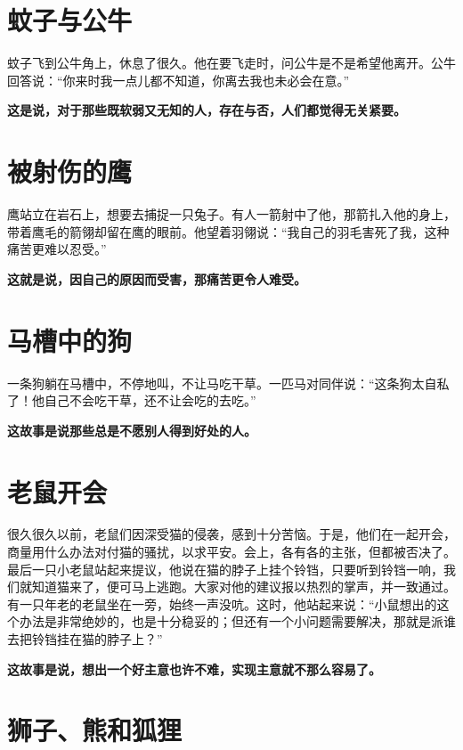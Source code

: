 \section{蚊子与公牛}

蚊子飞到公牛角上，休息了很久。他在要飞走时，问公牛是不是希望他离开。公牛回答说：“你来时我一点儿都不知道，你离去我也未必会在意。”

{\bfseries \color{red}这是说，对于那些既软弱又无知的人，存在与否，人们都觉得无关紧要。}

\section{被射伤的鹰}

鹰站立在岩石上，想要去捕捉一只兔子。有人一箭射中了他，那箭扎入他的身上，带着鹰毛的箭翎却留在鹰的眼前。他望着羽翎说：“我自己的羽毛害死了我，这种痛苦更难以忍受。”

{\bfseries \color{red}这就是说，因自己的原因而受害，那痛苦更令人难受。}

\section{马槽中的狗}

一条狗躺在马槽中，不停地叫，不让马吃干草。一匹马对同伴说：“这条狗太自私了！他自己不会吃干草，还不让会吃的去吃。”

{\bfseries \color{red}这故事是说那些总是不愿别人得到好处的人。}

\section{老鼠开会}

很久很久以前，老鼠们因深受猫的侵袭，感到十分苦恼。于是，他们在一起开会，商量用什么办法对付猫的骚扰，以求平安。会上，各有各的主张，但都被否决了。最后一只小老鼠站起来提议，他说在猫的脖子上挂个铃铛，只要听到铃铛一响，我们就知道猫来了，便可马上逃跑。大家对他的建议报以热烈的掌声，并一致通过。有一只年老的老鼠坐在一旁，始终一声没吭。这时，他站起来说：“小鼠想出的这个办法是非常绝妙的，也是十分稳妥的；但还有一个小问题需要解决，那就是派谁去把铃铛挂在猫的脖子上？”

{\bfseries \color{red}这故事是说，想出一个好主意也许不难，实现主意就不那么容易了。}

\section{狮子、熊和狐狸}

